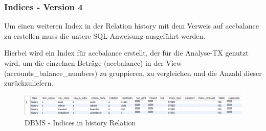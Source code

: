 \subsubsection{Indices - Version 4}
Um einen weiteren Index in der Relation history mit dem Verweis auf accbalance zu erstellen muss die untere SQL-Anweisung ausgeführt werden.

Hierbei wird ein Index für accbalance erstellt, der für die Analyse-TX genutzt wird, um die einzelnen Beträge (accbalance) in der View (accounts\_balance\_numbers) zu gruppieren, zu vergleichen und die Anzahl dieser zurückzuliefern.

\begin{figure}[h!]
    \center
    \includegraphics[width=\linewidth]{assets/img/database-history-indices}
    \caption{DBMS - Indices in history Relation}
    \label{fig:database-indices-history}
\end{figure}
